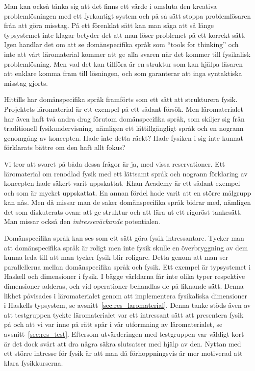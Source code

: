 Man kan också
tänka sig att det finns ett värde i omsluta den kreativa problemlösningen
med ett fyrkantigt system och på så sätt stoppa problemlösaren från att göra
misstag. På ett förenklat sätt kan man säga att så länge typsystemet inte klagar
betyder det att man löser problemet på ett korrekt sätt. Igen handlar det om att se
domänspecifika språk som ``tools for thinking'' och inte att vårt
läromaterial kommer att ge alla svaren när det kommer till fysikalisk
problemlösning. Men vad det kan tillföra är en struktur som kan hjälpa
läsaren att enklare komma fram till lösningen, och som garanterar att inga
syntaktiska misstag gjorts.

Hittills har domänspecifika språk framförts som ett sätt att strukturera fysik.
Projektets läromaterial är ett exempel på ett sådant försök. Men läromaterialet
har även haft två andra drag förutom domänspecifika språk, som skiljer sig från
traditionell fysikundervisning, nämligen ett lättillgängligt språk och en
nogrann genomgång av koncepten. Hade inte detta räckt? Hade fysiken i sig inte
kunnat förklarats bättre om den haft allt fokus?

Vi tror att svaret på båda dessa frågor är ja, med vissa reservationer. Ett
läromaterial om renodlad fysik med ett lättsamt språk och nogrann förklaring av
koncepten hade säkert varit uppskattat. Khan Academy är ett sådant
exempel~\cite{khan} och som är mycket uppskattat. En annan fördel hade varit att en större målgrupp kan nås.
Men då missar man de saker domänspecifika språk bidrar med, nämligen det som
diskuterats ovan: att ge struktur och att lära ut ett rigoröst tankesätt. Man
missar också den \textit{intresseväckande} potentialen.

Domänspecifika språk kan ses som ett sätt göra fysik intressantare. Tycker man
att domänspecifika språk är roligt men inte fysik skulle en överbryggning av dem
kunna leda till att man tycker fysik blir roligare. Detta genom att man ser
parallellerna mellan domänspecifika språk och fysik. Ett exempel är typsystemet i
Haskell och dimensioner i fysik. I bägge världarna får inte olika typer
respektive dimensioner adderas, och vid operationer behandlas de på liknande
sätt. Denna likhet påvisades i läromaterialet genom att implementera fysikaliska
dimensioner i Haskells typsystem, se avsnitt~\ref{sec:res_laromaterial}. Denna
tanke stöds även av att testgruppen tyckte läromaterialet var ett intressant sätt
att presentera fysik på och att vi var inne på rätt spår i vår utformning av
läromaterialet, se avsnitt~\ref{sec:res_test}. Eftersom utvärderingen med
testgruppen var väldigt kort är det dock svårt att dra några säkra slutsatser
med hjälp av den. Nyttan med ett större intresse för fysik är att man
då förhoppningsvis är mer motiverad att klara fysikkurserna.

